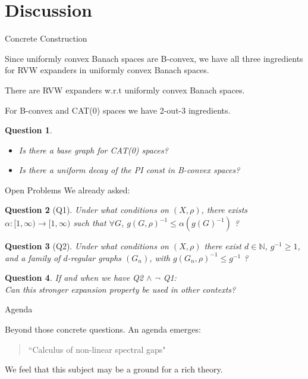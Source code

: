\documentclass[compress]{beamer}
\newtheorem{question}{Question}
\begin{document}
\section{Discussion}

\begin{frame}{Concrete Construction}

Since uniformly convex Banach spaces are B-convex, we have
all three ingredients for RVW expanders in uniformly convex Banach spaces.

\onslide<+->
\begin{theorem}
There are RVW expanders w.r.t uniformly convex Banach spaces.
\end{theorem}

\onslide<+->
For B-convex and CAT(0) spaces we have 2-out-3 ingredients. 
\begin{question}
\begin{itemize}
\item Is there a base graph for CAT(0) spaces?
\item Is there a uniform decay of the PI const in B-convex spaces?
\end{itemize}
\end{question}

\end{frame}

\begin{frame}{Open Problems}
\onslide<+->
We already asked:
\begin{question}[Q1]
Under what conditions on $(X,\rho)$, there exists $\alpha:[1,\infty)\to [1,\infty)$ such that
$\forall G$,  $g(G,\rho)^{-1} \le \alpha(g(G)^{-1})$ ?
\end{question}

\begin{question}[Q2]
Under what conditions on $(X,\rho)$ there exist $d\in \mathbb N$,  $g^{-1}\ge 1$, and a family of $d$-regular graphs
$(G_n)$, with $g(G_n,\rho)^{-1}\le g^{-1}$ ?
\end{question} 

\onslide<+->
\begin{question}
If and when we have Q2 $\land$ $\lnot$ Q1:\\
Can this stronger expansion property be used in other contexts?
\end{question}

\end{frame}


\begin{frame}{Agenda}

\onslide<+->
Beyond those concrete questions. An agenda emerges:

\begin{quote}
``Calculus of non-linear spectral gaps"
\end{quote}

We feel that this subject may be a ground for a rich theory.

\end{frame}
\end{document}
